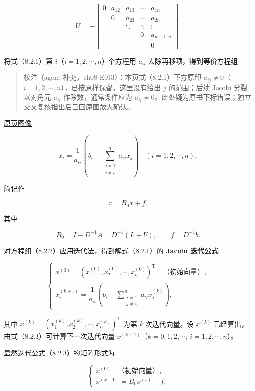 \documentclass[
  10pt,
  fontset=fandol]{ctexart}
\begin{document}
\[
U=-\begin{bmatrix}
0&a_{12}&a_{13}&\cdots&a_{1n}\\
&0&a_{23}&\cdots&a_{2n}\\
&&\ddots&\ddots&\vdots\\
&&&0&a_{n-1,n}\\
&&&&0
\end{bmatrix}.
\]

将式（8.2.1）第 \(i\)（\(i=1,2,\cdots,n\)）个方程用 \(a_{ii}\) 去除再移项，得到等价方程组

\begin{quote}
校注（agent 补充，ch08-E013）：本页式（8.2.1）下方原印 \(a_{ij}\neq0\)（\(i=1,2,\cdots,n\)），已按原样保留。这里没有给出 \(j\) 的范围；后续 Jacobi 分裂以对角元 \(a_{ii}\) 作除数，通常条件应为 \(a_{ii}\neq0\)。此处疑为原书下标错误；独立交叉复核指出后已回原图放大确认。
\end{quote}

\href{../../source-images/pdf-218.jpeg}{原页图像}

\[
x_i=\frac1{a_{ii}}\left(b_i-\sum_{\substack{j=1\\j\neq i}}^n a_{ij}x_j\right)\quad(i=1,2,\cdots,n),
\tag{8.2.2}
\]

简记作

\[
x=B_0x+f,
\]

其中

\[
B_0=I-D^{-1}A=D^{-1}(L+U),\qquad f=D^{-1}b.
\]

对方程组（8.2.2）应用迭代法，得到解式（8.2.1）的 \textbf{Jacobi 迭代公式}

\[
\begin{cases}
x^{(0)}=(x_1^{(0)},x_2^{(0)},\cdots,x_n^{(0)})^{\mathrm T}\quad\text{（初始向量）},\\[4pt]
x_i^{(k+1)}=\dfrac1{a_{ii}}\left(b_i-\displaystyle\sum_{\substack{i=1\\j\neq i}}^n a_{ij}x_j^{(k)}\right),
\end{cases}
\tag{8.2.3}
\]

其中 \(x^{(k)}=(x_1^{(k)},x_2^{(k)},\cdots,x_n^{(k)})^{\mathrm T}\) 为第 \(k\) 次迭代向量。设 \(x^{(k)}\) 已经算出，由式（8.2.3）可计算下一次迭代向量 \(x^{(k+1)}\)（\(k=0,\allowbreak 1,\allowbreak 2,\allowbreak \cdots;\ i=1,\allowbreak 2,\allowbreak \cdots,\allowbreak n\)）。

显然迭代公式（8.2.3）的矩阵形式为

\[
\begin{cases}
x^{(0)}\quad\text{（初始向量）},\\
x^{(k+1)}=B_0x^{(k)}+f,
\end{cases}
\tag{8.2.4}
\]
\end{document}
